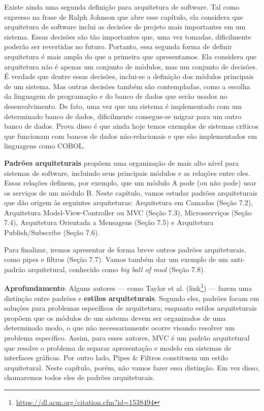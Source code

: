 \documentclass[
  11pt,
  twoside]{book}
\DeclareRobustCommand{\href}[2]{#2\footnote{\url{#1}}}
\newenvironment{esmbox}{\centering \vspace{1.5ex} \begin{tcolorbox}[breakable, colback=backcolor, width=4.9in]}{\end{tcolorbox} \vspace{1.5ex}}
\begin{document}
Existe ainda uma segunda definição para arquitetura de software. Tal
como expresso na frase de Ralph Johnson que abre esse capítulo, ela
considera que arquitetura de software inclui as decisões de projeto mais
importantes em um sistema. Essas decisões são tão importantes que, uma
vez tomadas, dificilmente poderão ser revertidas no futuro. Portanto,
essa segunda forma de definir arquitetura é mais ampla do que a primeira
que apresentamos. Ela considera que arquitetura não é apenas um conjunto
de módulos, mas um conjunto de decisões. É verdade que dentre essas
decisões, inclui-se a definição dos módulos principais de um sistema.
Mas outras decisões também são contempladas, como a escolha da linguagem
de programação e do banco de dados que serão usados no desenvolvimento.
De fato, uma vez que um sistema é implementado com um determinado banco
de dados, dificilmente consegue-se migrar para um outro banco de dados.
Prova disso é que ainda hoje temos exemplos de sistemas críticos que
funcionam com bancos de dados não-relacionais e que são implementados em
linguagens como COBOL.

 \textbf{Padrões arquiteturais} propõem uma
organização de mais alto nível para sistemas de software, incluindo seus
principais módulos e as relações entre eles. Essas relações definem, por
exemplo, que um módulo A pode (ou não pode) usar os serviços de um
módulo B. Neste capítulo, vamos estudar padrões arquiteturais que dão
origem às seguintes arquiteturas: Arquitetura em Camadas (Seção 7.2),
Arquitetura Model-View-Controller ou MVC (Seção 7.3), Microsserviços
(Seção 7.4), Arquitetura Orientada a Mensagens (Seção 7.5) e Arquitetura
Publish/Subscribe (Seção 7.6).

Para finalizar, iremos apresentar de forma breve outros padrões
arquiteturais, como pipes e filtros (Seção 7.7). Vamos também dar um
exemplo de um anti-padrão arquitetural, conhecido como \emph{big ball of
mud} (Seção 7.8).


\begin{esmbox}

\textbf{Aprofundamento}: Alguns autores --- como Taylor et al.
(\href{https://dl.acm.org/citation.cfm?id=1538494}{link}) --- fazem uma
distinção entre padrões e \textbf{estilos arquiteturais}. Segundo eles,
padrões focam em soluções para problemas específicos de arquitetura;
enquanto estilos arquiteturais propõem que os módulos de um sistema
devem ser organizados de uma determinado modo, o que não necessariamente
ocorre visando resolver um problema específico. Assim, para esses
autores, MVC é um padrão arquitetural que resolve o problema de separar
apresentação e modelo em sistemas de interfaces gráficas. Por outro
lado, Pipes \& Filtros constituem um estilo arquitetural. Neste
capítulo, porém, não vamos fazer essa distinção. Em vez disso,
chamaremos todos eles de padrões arquiteturais.

\end{esmbox}
\end{document}
